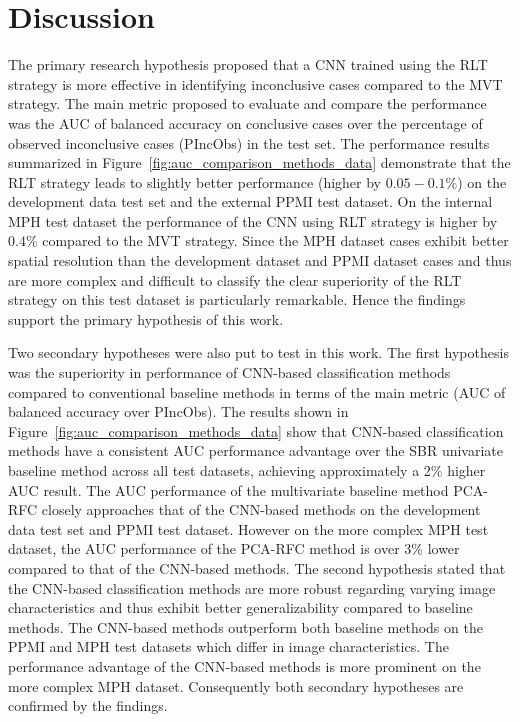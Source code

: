\section{Discussion}
\label{sec:discussion}


The primary research hypothesis proposed that a CNN trained using the RLT strategy
is more effective in identifying inconclusive cases compared to the MVT strategy.
The main metric proposed to evaluate and compare the performance was the
AUC of balanced accuracy on conclusive cases over the percentage of observed inconclusive cases (PIncObs) in the test set.
The performance results summarized in Figure~\ref{fig:auc_comparison_methods_data} demonstrate 
that the RLT strategy leads to slightly better performance (higher by $0.05-0.1\%$) on the development data test set 
and the external PPMI test dataset.
On the internal MPH test dataset the performance of the CNN using RLT strategy is higher by $0.4\%$ compared to the MVT strategy.
Since the MPH dataset cases exhibit better spatial resolution than the development dataset and PPMI dataset cases
and thus are more complex and difficult to classify 
the clear superiority of the RLT strategy on this test dataset is particularly remarkable.
Hence the findings support the primary hypothesis of this work.

Two secondary hypotheses were also put to test in this work.
The first hypothesis was the superiority in performance of CNN-based classification methods compared to 
conventional baseline methods in terms of the main metric (AUC of balanced accuracy over PIncObs).
The results shown in Figure~\ref{fig:auc_comparison_methods_data} show that CNN-based classification methods
have a consistent AUC performance advantage over the SBR univariate baseline method across all test datasets, 
achieving approximately a 2\% higher AUC result.
The AUC performance of the multivariate baseline method PCA-RFC closely approaches that of the CNN-based methods 
on the development data test set and PPMI test dataset.
However on the more complex MPH test dataset, the AUC performance of the PCA-RFC method is over 3\% lower
compared to that of the CNN-based methods.
The second hypothesis stated that the CNN-based classification methods are 
more robust regarding varying image characteristics and thus exhibit better generalizability compared to baseline methods.
The CNN-based methods outperform both baseline methods on the PPMI and MPH test datasets which differ in image characteristics.
The performance advantage of the CNN-based methods is more prominent on the more complex MPH dataset.
Consequently both secondary hypotheses are confirmed by the findings.





